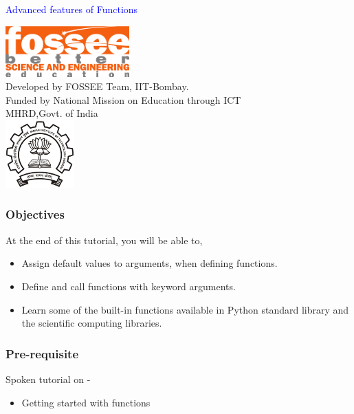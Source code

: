 \documentclass[presentation]{beamer}
\title{}
\author{FOSSEE}
\date{}
\begin{document}
\begin{frame}

\begin{center}
\vspace{12pt}
\textcolor{blue}{\huge Advanced features of Functions}
\end{center}
\vspace{18pt}
\begin{center}
\vspace{10pt}
\includegraphics[scale=0.95]{../images/fossee-logo.png}\\
\vspace{5pt}
\scriptsize Developed by FOSSEE Team, IIT-Bombay. \\ 
\scriptsize Funded by National Mission on Education through ICT\\
\scriptsize  MHRD,Govt. of India\\
\includegraphics[scale=0.30]{../images/iitb-logo.png}\\
\end{center}
\end{frame}
\begin{frame}
\frametitle{Objectives}
\label{sec-2}

 At the end of this tutorial, you will be able to, 


\begin{itemize}
\item Assign default values to arguments, when defining functions.
\item Define and call functions with keyword arguments.
\item Learn some of the built-in functions available in Python standard 
    library and the scientific computing libraries.
\end{itemize}
\end{frame}
\begin{frame}
\frametitle{Pre-requisite}
\label{sec-3}

Spoken tutorial on -

\begin{itemize}
\item Getting started with functions
\end{itemize}
\end{frame}
\end{document}
